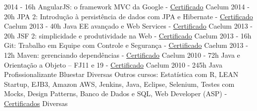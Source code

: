 \begin{entrylistii}
  \entryii
    {2014 - 16h}
    {AngularJS: o framework MVC da Google - \href{https://www.alura.com.br/user/3311/fullCertificate/bdd8817990ef209f0fb6b049f2d2ea0c}{Certificado}}
    {Caelum}
  \entryii
    {2014 - 20h}
    {JPA 2: Introdução à persistência de dados com JPA e Hibernate - \href{https://www.alura.com.br/user/3311/fullCertificate/bdd8817990ef209f0fb6b049f2d2ea0c}{Certificado}}
    {Caelum}
  \entryii
    {2013 - 40h}
    {Java EE avançado e Web Services - \href{https://www.alura.com.br/user/3311/fullCertificate/bdd8817990ef209f0fb6b049f2d2ea0c}{Certificado}}
    {Caelum}
  \entryii
    {2013 - 20h}
    {JSF 2: simplicidade e produtividade na Web - \href{https://www.alura.com.br/user/3311/fullCertificate/bdd8817990ef209f0fb6b049f2d2ea0c}{Certificado}}
    {Caelum}
  \entryii
    {2013 - 16h}
    {Git: Trabalho em Equipe com Controle e Segurança - \href{https://www.alura.com.br/user/3311/fullCertificate/bdd8817990ef209f0fb6b049f2d2ea0c}{Certificado}}
    {Caelum}
  \entryii
    {2013 - 12h}
    {Maven: gerenciando dependências - \href{https://www.alura.com.br/user/3311/fullCertificate/bdd8817990ef209f0fb6b049f2d2ea0c}{Certificado}}
    {Caelum}
  \entryii
    {2010 - 72h}
    {Java e Orientação a Objeto – FJ11 e 19 - \href{https://www.alura.com.br/user/3311/fullCertificate/bdd8817990ef209f0fb6b049f2d2ea0c}{Certificado}}
    {Caelum}
  \entryii
    {2010 - 245h}
    {Java Profissionalizante}
    {Bluestar}
  \entryii
    {Diversas}
    {Outros cursos: Estatística com R, LEAN Startup, EJB3, Amazon AWS, Jenkins, Java, Eclipse, Selenium, Testes com Mocks, Design Patterns, Banco de Dados e SQL, Web Developer (ASP) - \href{https://www.alura.com.br/user/3311/fullCertificate/bdd8817990ef209f0fb6b049f2d2ea0c}{Certificados}}
    {Diversas}
\end{entrylistii}

